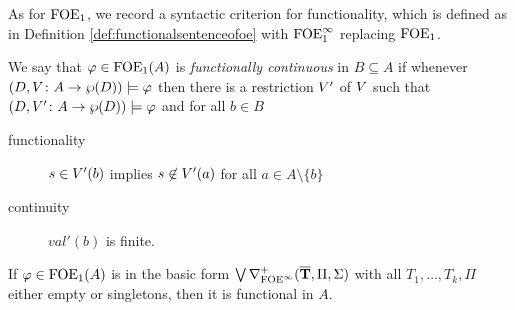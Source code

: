 As for $\mathrm{FOE}_1$, we record a syntactic criterion for functionality, which is defined as in Definition \ref{def:functionalsentenceofoe} with $\mathrm{FOE}^{\infty}_1$ replacing $\mathrm{FOE}_1$. 

\begin{definition}We say that $\varphi \in \mathrm{FOE}_1(A)$ is \emph{functionally continuous} in $B\subseteq A$ if whenever $(D,V \colon A \to \wp(D)) \models \varphi$ then there is a restriction $V'$ of $V$ such that $(D,V' \colon A \to \wp(D)) \models \varphi$ and for all $b \in B$
\begin{description}
\item[functionality] $s \in V'(b)$ implies $s \not\in V'(a)$ for all $a \in A\setminus\{b\}$
\item[continuity] $val'(b)$ is finite.
\end{description}
\end{definition}

\begin{proposition}\label{lemma:functionalsentenceofoe} If $\varphi \in \mathrm{FOE}_1(A)$ is in the basic form $\bigvee \nabla^+_{\mathrm{FOE}^{\infty}}(\overline{{\mathbf{T}}},\Pi,\Sigma)$ with all $T_1, \dots, T_k,\Pi$ either empty or singletons, then it is functional in $A$.
\end{proposition}
